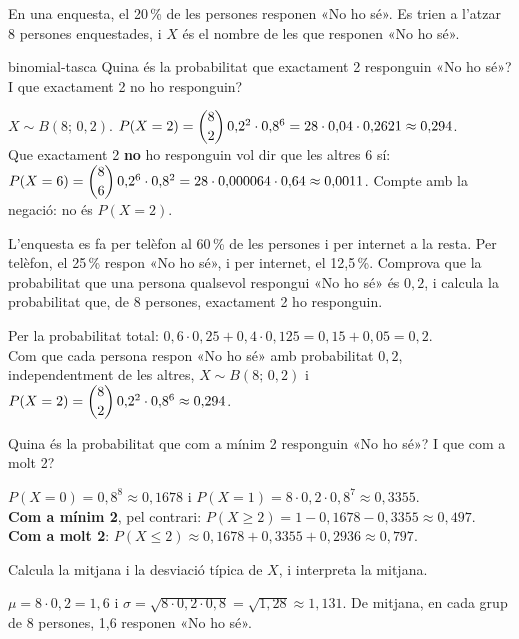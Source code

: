 En una enquesta, el 20\,\% de les persones responen «No ho sé». Es trien a l'atzar 8 persones enquestades, i
$X$ és el nombre de les que responen «No ho sé».

\begin{apartats}

\begin{tria}{binomial-tasca}
Quina és la probabilitat que exactament 2 responguin «No ho sé»? I que exactament 2 no ho responguin?

\begin{solucio}
$X\sim B(8;\,0{,}2)$. $P(X=2)=\dbinom82\,0{,}2^2\cdot0{,}8^6=28\cdot0{,}04\cdot0{,}2621\approx0{,}294$.\\
Que exactament 2 \textbf{no} ho responguin vol dir que les altres 6 sí:
$P(X=6)=\dbinom86\,0{,}2^6\cdot0{,}8^2=28\cdot0{,}000064\cdot0{,}64\approx0{,}0011$. Compte amb la negació:
no és $P(X=2)$.
\end{solucio}

L'enquesta es fa per telèfon al 60\,\% de les persones i per internet a la resta. Per telèfon, el 25\,\%
respon «No ho sé», i per internet, el 12,5\,\%. Comprova que la probabilitat que una persona qualsevol
respongui «No ho sé» és $0{,}2$, i calcula la probabilitat que, de 8 persones, exactament 2 ho responguin.

\begin{solucio}
Per la probabilitat total: $0{,}6\cdot0{,}25+0{,}4\cdot0{,}125=0{,}15+0{,}05=0{,}2$.\\
Com que cada persona respon «No ho sé» amb probabilitat $0{,}2$, independentment de les altres,
$X\sim B(8;\,0{,}2)$ i $P(X=2)=\dbinom82\,0{,}2^2\cdot0{,}8^6\approx0{,}294$.
\end{solucio}
\end{tria}

Quina és la probabilitat que com a mínim 2 responguin «No ho sé»? I que com a molt 2?

\begin{solucio}
$P(X=0)=0{,}8^8\approx0{,}1678$ i $P(X=1)=8\cdot0{,}2\cdot0{,}8^7\approx0{,}3355$.\\
\textbf{Com a mínim 2}, pel contrari: $P(X\ge2)=1-0{,}1678-0{,}3355\approx0{,}497$.\\
\textbf{Com a molt 2}: $P(X\le2)\approx0{,}1678+0{,}3355+0{,}2936\approx0{,}797$.
\end{solucio}

\begin{nomesllarg}
Calcula la mitjana i la desviació típica de $X$, i interpreta la mitjana.

\begin{solucio}
$\mu=8\cdot0{,}2=1{,}6$ i $\sigma=\sqrt{8\cdot0{,}2\cdot0{,}8}=\sqrt{1{,}28}\approx1{,}131$. De mitjana, en cada
grup de 8 persones, 1,6 responen «No ho sé».
\end{solucio}
\end{nomesllarg}

\end{apartats}

